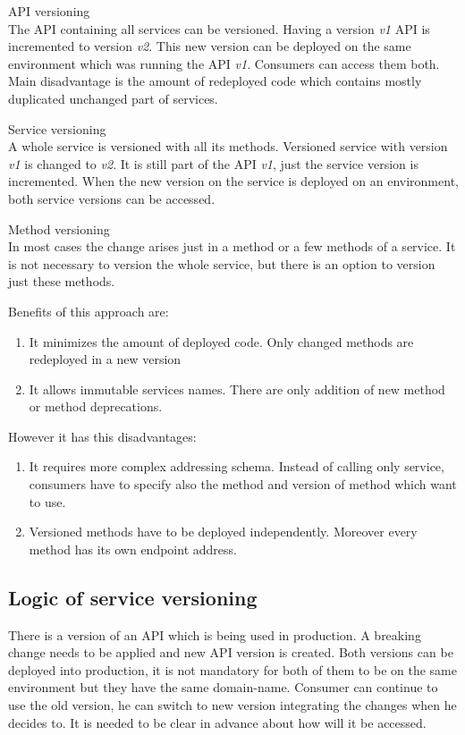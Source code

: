 \begin{description}
\item{API versioning} \\
The API containing all services can be versioned. Having a version \emph{v1} API is incremented to version \emph{v2}. This new version can be deployed on the same environment which was running the API \emph{v1}. Consumers can access them both. Main disadvantage is the amount of redeployed code which contains mostly duplicated unchanged part of services. 
\item{Service versioning} \\
  A whole service is versioned with all its methods. Versioned service with version \emph{v1} is changed to \emph{v2}. It is still part of the API \emph{v1}, just the service version is incremented. When the new version on the service is deployed on an environment, both service versions can be accessed. 
\item{Method versioning} \\
  In most cases the change arises just in a method or a few methods of a service. It is not necessary to version the whole service, but there is an option to version just these methods. 
  
  Benefits of this approach are:
  
  \begin{enumerate}
    \item It minimizes the amount of deployed code. Only changed methods are redeployed in a new version
    \item It allows immutable services names. There are only addition of new method or method deprecations.
  \end{enumerate}
  
  However it has this disadvantages:
  
  \begin{enumerate}
    \item It requires more complex addressing schema. Instead of calling only service, consumers have to specify also the method and version of method which want to use.
    \item Versioned methods have to be deployed independently. Moreover every method has its own endpoint address.
  \end{enumerate}
\end{description}


\subsection{Logic of service versioning}
There is a version of an API which is being used in production. A breaking change needs to be applied and new API version is created. Both versions can be deployed into production, it is not mandatory for both of them to be on the same environment but they have the same \gls{domain-name}. Consumer can continue to use the old version, he can switch to new version integrating the changes when he decides to. It is needed to be clear in advance about how will it be accessed.


